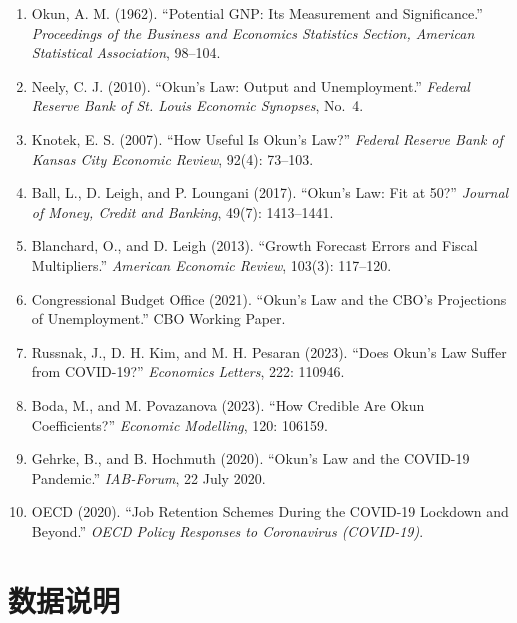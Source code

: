 \documentclass[12pt,a4paper,UTF8]{ctexart}
\begin{document}
\begin{enumerate}
\item Okun, A. M. (1962). ``Potential GNP: Its Measurement and Significance.'' \textit{Proceedings of the Business and Economics Statistics Section, American Statistical Association}, 98--104.

\item Neely, C. J. (2010). ``Okun's Law: Output and Unemployment.'' \textit{Federal Reserve Bank of St. Louis Economic Synopses}, No.~4.

\item Knotek, E. S. (2007). ``How Useful Is Okun's Law?'' \textit{Federal Reserve Bank of Kansas City Economic Review}, 92(4): 73--103.

\item Ball, L., D. Leigh, and P. Loungani (2017). ``Okun's Law: Fit at 50?'' \textit{Journal of Money, Credit and Banking}, 49(7): 1413--1441.

\item Blanchard, O., and D. Leigh (2013). ``Growth Forecast Errors and Fiscal Multipliers.'' \textit{American Economic Review}, 103(3): 117--120.

\item Congressional Budget Office (2021). ``Okun's Law and the CBO's Projections of Unemployment.'' CBO Working Paper.

\item Russnak, J., D. H. Kim, and M. H. Pesaran (2023). ``Does Okun's Law Suffer from COVID-19?'' \textit{Economics Letters}, 222: 110946.

\item Boda, M., and M. Povazanova (2023). ``How Credible Are Okun Coefficients?'' \textit{Economic Modelling}, 120: 106159.

\item Gehrke, B., and B. Hochmuth (2020). ``Okun's Law and the COVID-19 Pandemic.'' \textit{IAB-Forum}, 22 July 2020.

\item OECD (2020). ``Job Retention Schemes During the COVID-19 Lockdown and Beyond.'' \textit{OECD Policy Responses to Coronavirus (COVID-19)}.
\end{enumerate}

\newpage

\appendix

\section{数据说明}
\end{document}

